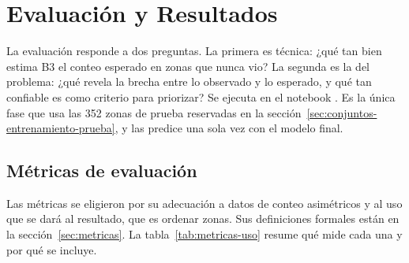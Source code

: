 \section{Evaluación y Resultados}
\label{sec:evaluacion-resultados}

La evaluación responde a dos preguntas. La primera es técnica: ¿qué tan bien estima B3 el
conteo esperado en zonas que nunca vio? La segunda es la del problema: ¿qué revela la
brecha entre lo observado y lo esperado, y qué tan confiable es como criterio para
priorizar? Se ejecuta en el notebook . Es la única fase que usa las 352
zonas de prueba reservadas en la sección~\ref{sec:conjuntos-entrenamiento-prueba}, y las
predice una sola vez con el modelo final.

\subsection{Métricas de evaluación}
\label{sec:metricas-evaluacion}

Las métricas se eligieron por su adecuación a datos de conteo asimétricos y al uso que se
dará al resultado, que es ordenar zonas. Sus definiciones formales están en la
sección~\ref{sec:metricas}. La tabla~\ref{tab:metricas-uso} resume qué mide cada una y por
qué se incluye.

